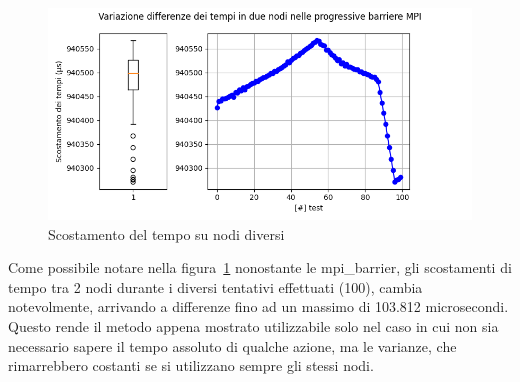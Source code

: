 \begin{figure}[H]%
    \centering
    \includegraphics[width=\textwidth]{./results/time_sync_node.png}
    \caption{Scostamento del tempo su nodi diversi}\label{fig:sync_time_shift1}
\end{figure}

Come possibile notare nella figura~\ref{fig:sync_time_shift1} nonostante le mpi\_barrier, gli scostamenti di tempo tra 2 nodi durante i diversi tentativi effettuati (100), cambia notevolmente, arrivando a differenze fino ad un massimo di 103.812 microsecondi. Questo rende il metodo appena mostrato utilizzabile solo nel caso in cui non sia necessario sapere il tempo assoluto di qualche azione, ma le varianze, che rimarrebbero costanti se si utilizzano sempre gli stessi nodi.
